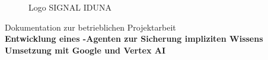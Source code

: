 \documentclass[
  10pt,
  ngerman,
  a4paper,
  toc=graduated,
  numbers=noenddot,
  headings=standardclasses,
  nonumberlist
]{scrartcl}
\begin{document}
\hypersetup{pageanchor=false}
\thispagestyle{empty}

\vspace{1cm}

\begin{figure}[htbp]
    \centering

    \begin{minipage}[t]{0.45\textwidth}
        \raggedright
        
        \captionsetup{justification=raggedright,singlelinecheck=false}
        \caption{Logo der IHK Hamburg \cite{ihk_logo}}
        \label{fig:ihk_logo}
    \end{minipage}
    \hfill
    \begin{minipage}[t]{0.45\textwidth}
        \raggedleft
        
        \captionsetup{justification=raggedleft,singlelinecheck=false}
        \caption{Logo SIGNAL IDUNA \cite{signal_iduna_logo}}
        \label{fig:signal_iduna_logo}
    \end{minipage}

\end{figure}

\vspace{1cm}
\begin{center}
	{\Large Dokumentation zur betrieblichen Projektarbeit} \\
	\vspace{3cm}
	{\huge \textbf{Entwicklung eines -Agenten zur Sicherung impliziten Wissens}}\\
    \vspace{0.3cm}
    {\LARGE \textbf{{Umsetzung mit Google  und Vertex AI}}}\\
    
\end{center}
\end{document}
